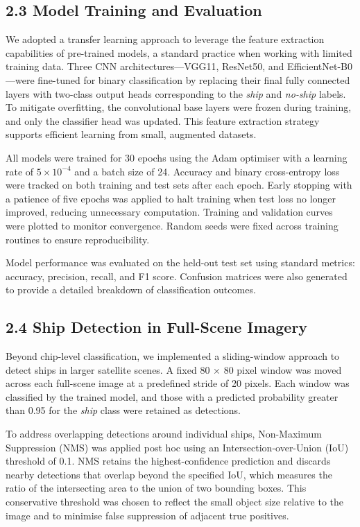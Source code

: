 \documentclass[11pt]{article}
\begin{document}
	\subsection*{2.3 Model Training and Evaluation}
	
	We adopted a transfer learning approach to leverage the feature extraction capabilities of pre-trained models, a standard practice when working with limited training data. Three CNN architectures—VGG11, ResNet50, and EfficientNet-B0—were fine-tuned for binary classification by replacing their final fully connected layers with two-class output heads corresponding to the \textit{ship} and \textit{no-ship} labels. To mitigate overfitting, the convolutional base layers were frozen during training, and only the classifier head was updated. This feature extraction strategy supports efficient learning from small, augmented datasets.
	
	All models were trained for 30 epochs using the Adam optimiser with a learning rate of $5 \times 10^{-4}$ and a batch size of 24. Accuracy and binary cross-entropy loss were tracked on both training and test sets after each epoch. Early stopping with a patience of five epochs was applied to halt training when test loss no longer improved, reducing unnecessary computation. Training and validation curves were plotted to monitor convergence. Random seeds were fixed across training routines to ensure reproducibility.
	
	Model performance was evaluated on the held-out test set using standard metrics: accuracy, precision, recall, and F1 score. Confusion matrices were also generated to provide a detailed breakdown of classification outcomes.
		
	\subsection*{2.4 Ship Detection in Full-Scene Imagery}
	
	Beyond chip-level classification, we implemented a sliding-window approach to detect ships in larger satellite scenes. A fixed 80 × 80 pixel window was moved across each full-scene image at a predefined stride of 20 pixels. Each window was classified by the trained model, and those with a predicted probability greater than 0.95 for the \textit{ship} class were retained as detections.
	
	To address overlapping detections around individual ships, Non-Maximum Suppression (NMS) was applied post hoc using an Intersection-over-Union (IoU) threshold of 0.1. NMS retains the highest-confidence prediction and discards nearby detections that overlap beyond the specified IoU, which measures the ratio of the intersecting area to the union of two bounding boxes. This conservative threshold was chosen to reflect the small object size relative to the image and to minimise false suppression of adjacent true positives.
	
\end{document}

